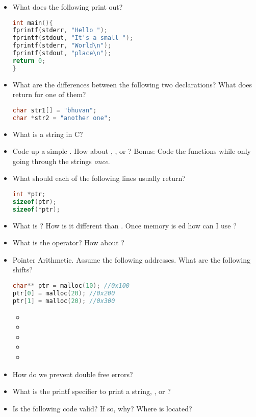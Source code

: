 \begin{itemize}
	\item
	      What does the following print out?

	      \begin{lstlisting}[language=C]
int main(){
fprintf(stderr, "Hello ");
fprintf(stdout, "It's a small ");
fprintf(stderr, "World\n");
fprintf(stdout, "place\n");
return 0;
}
\end{lstlisting}
	\item
	      What are the differences between the following two declarations? What
	      does  return for one of them?

	      \begin{lstlisting}[language=C]
char str1[] = "bhuvan";
char *str2 = "another one";
\end{lstlisting}
	\item
	      What is a string in C?
	\item
	      Code up a simple . How about , , or ? Bonus: Code the functions while only going through the strings \emph{once}.
	\item
	      What should each of the following lines usually return?

	      \begin{lstlisting}[language=C]
int *ptr;
sizeof(ptr);
sizeof(*ptr);
\end{lstlisting}
	\item
	      What is ? How is it different than . Once memory is ed how can I use ?
	\item
	      What is the \keyword{\&} operator? How about \keyword{*}?
	\item
	      Pointer Arithmetic. Assume the following addresses. What are the following shifts?

	      \begin{lstlisting}[language=C]
char** ptr = malloc(10); //0x100
ptr[0] = malloc(20); //0x200
ptr[1] = malloc(20); //0x300
\end{lstlisting}

	      \begin{itemize}
		      \tightlist
		      \item
		      \item
		      \item
		      \item
		      \item
	      \end{itemize}
	\item
	      How do we prevent double free errors?
	\item
	      What is the printf specifier to print a string, , or
	      ?
	\item
	      Is the following code valid? If so, why? Where is 
	      located?


\end{itemize}
